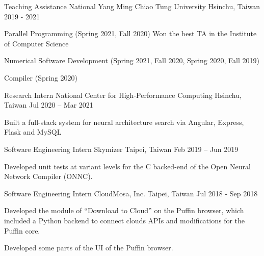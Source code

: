 

\begin{cventries}

  \cventry
    {Teaching Assistance} %
    {National Yang Ming Chiao Tung University} %
    {Hsinchu, Taiwan} %
    {2019 - 2021} %
    {
      \begin{cvitems} %
        \item {Parallel Programming (Spring 2021, Fall 2020) Won the best TA in the Institute of Computer Science}
        \item {Numerical Software Development (Spring 2021, Fall 2020, Spring 2020, Fall 2019)}
        \item {Compiler (Spring 2020)}
      \end{cvitems}
    }

  \cventry
    {Research Intern} %
    {National Center for High-Performance Computing} %
    {Hsinchu, Taiwan} %
    {Jul 2020 – Mar 2021} %
    {
      \begin{cvitems} %
        \item {Built a full-stack system for neural architecture search via Angular, Express, Flask and MySQL}
      \end{cvitems}
    }

  \cventry
    {Software Engineering Intern} %
    {Skymizer} %
    {Taipei, Taiwan} %
    {Feb 2019 – Jun 2019} %
    {
      \begin{cvitems} %
        \item {Developed unit tests at variant levels for the C backed-end of the Open Neural Network Compiler (ONNC).}
      \end{cvitems}
    }

  \cventry
    {Software Engineering Intern} %
    {CloudMosa, Inc.} %
    {Taipei, Taiwan} %
    {Jul 2018 - Sep 2018} %
    {
      \begin{cvitems} %
        \item {Developed the module of ``Download to Cloud'' on the Puffin browser, which included a Python backend to connect clouds APIs and modifications for the Puffin core.}
        \item {Developed some parts of the UI of the Puffin browser.}
      \end{cvitems}
    }


\end{cventries}
